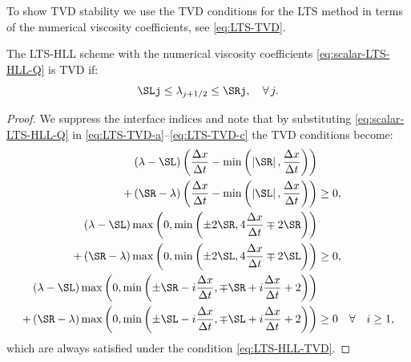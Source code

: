 To show TVD stability we use the TVD conditions for the LTS method in terms of the numerical viscosity coefficients, see \eqref{eq:LTS-TVD}.

\begin{lemma} \label{lemma:LTS-HLL-TVD}
The LTS-HLL scheme with the numerical viscosity coefficients \eqref{eq:scalar-LTS-HLL-Q} is TVD if:
\begin{equation} \label{eq:LTS-HLL-TVD}
\SLj \leq \lambda_{j+1/2} \leq \SRj, \quad \forall \, j.
\end{equation}
\end{lemma}

\begin{proof}
We suppress the interface indices and note that by substituting \eqref{eq:scalar-LTS-HLL-Q} in \eqref{eq:LTS-TVD-a}--\eqref{eq:LTS-TVD-c} the TVD conditions become:
\begin{subequations}
\begin{align}
  \left( \lambda - \SL \right) \left( \frac{\Delta x}{\Delta t} - \min \left( \left| \SR \right|, \frac{\Delta x}{\Delta t} \right) \right) & \notag \\ 
+ \left( \SR - \lambda \right) \left( \frac{\Delta x}{\Delta t} - \min \left( \left| \SL \right|, \frac{\Delta x}{\Delta t} \right) \right) 
& \geq 0, \\
  \left( \lambda - \SL \right) \max \left( 0, \min \left( \pm 2 \SR, 4 \frac{\Delta x}{\Delta t} \mp 2\SR \right) \right) \notag \\
+ \left( \SR - \lambda \right) \max \left( 0, \min \left( \pm 2 \SL, 4 \frac{\Delta x}{\Delta t} \mp 2\SL \right) \right)
& \geq 0, \\
  \left( \lambda - \SL \right) \max \left( 0, \min \left( \pm \SR - i \frac{\Delta x}{\Delta t}, \mp \SR + i \frac{\Delta x}{\Delta t} + 2 \right) \right) & \notag \\
+ \left( \SR - \lambda \right) \max \left( 0, \min \left( \pm \SL - i \frac{\Delta x}{\Delta t}, \mp \SL + i \frac{\Delta x}{\Delta t} + 2 \right) \right) & \geq 0 \quad \forall \quad i \geq 1,
\end{align}
\end{subequations}
which are always satisfied under the condition \eqref{eq:LTS-HLL-TVD}.
\end{proof}

%

